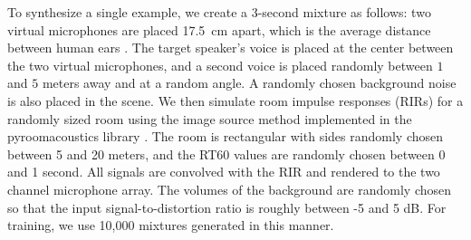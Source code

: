 \documentclass [11pt, proquest] {uwthesis}[2020/02/24]
\begin{document}
To synthesize a single example, we create a 3-second mixture as follows: two virtual microphones are placed 17.5~cm apart, which is the average distance between human ears \cite{RISOUD2018259}. The target speaker's voice is placed  at the center between the two virtual microphones, and a second voice is placed randomly between $1$ and $5$ meters away and at a random angle. A randomly chosen background noise is also placed in the scene. We then simulate room impulse responses (RIRs) for a randomly sized room using the image source method implemented in the pyroomacoustics library \cite{allen1979image, scheibler2018pyroomacoustics}. The room is rectangular with sides randomly chosen between 5 and 20 meters, and the RT60 values are randomly chosen between 0 and 1 second. All signals are convolved with the RIR and rendered to the two channel microphone array. The volumes of the background are randomly chosen so that the input signal-to-distortion ratio is roughly between -5 and 5 dB. For training, we use 10,000 mixtures generated in this manner.
\end{document}
